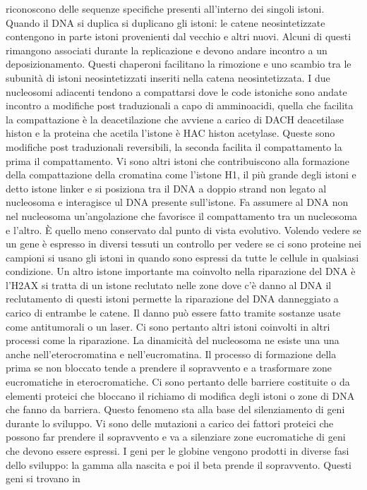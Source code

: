 riconoscono delle sequenze specifiche presenti all'interno dei singoli istoni. Quando il DNA si duplica si duplicano gli istoni: le catene neosintetizzate contengono in parte istoni 
provenienti dal vecchio e altri nuovi. Alcuni di questi rimangono associati durante la replicazione e devono andare incontro a un deposizionamento. Questi chaperoni facilitano la 
rimozione e uno scambio tra le subunit\`a di istoni neosintetizzati inseriti nella catena neosintetizzata. I due nucleosomi adiacenti tendono a compattarsi dove le code istoniche sono
andate incontro a modifiche post traduzionali a capo di amminoacidi, quella che facilita la compattazione \`e la deacetilazione che avviene a carico di DACH deacetilase histon e la 
proteina che acetila l'istone \`e HAC histon acetylase. Queste sono modifiche post traduzionali reversibili, la seconda facilita il compattamento la prima il compattamento. Vi sono 
altri istoni che contribuiscono alla formazione della compattazione della cromatina come l'istone H1, il pi\`u grande degli istoni e detto istone linker e si posiziona tra il DNA a 
doppio strand non legato al nucleosoma e interagisce ul DNA presente sull'istone. Fa assumere al DNA non nel nucleosoma un'angolazione che favorisce il compattamento tra un nucleosoma e 
l'altro. \`E quello meno conservato dal punto di vista evolutivo. Volendo vedere se un gene \`e espresso in diversi tessuti un controllo per vedere se ci sono proteine nei campioni si 
usano gli istoni in quando sono espressi da tutte le cellule in qualsiasi condizione. Un altro istone importante ma coinvolto nella riparazione del DNA \`e l'H2AX si tratta di un istone 
reclutato nelle zone dove c'\`e danno al DNA il reclutamento di questi istoni permette la riparazione del DNA danneggiato a carico di entrambe le catene. Il danno pu\`o essere fatto 
tramite sostanze usate come antitumorali o un laser. Ci sono pertanto altri istoni coinvolti in altri processi come la riparazione. La dinamicit\`a del nucleosoma ne esiste una una anche
nell'eterocromatina e nell'eucromatina. Il processo di formazione della prima se non bloccato tende a prendere il sopravvento e a trasformare zone eucromatiche in eterocromatiche. Ci sono
pertanto delle barriere costituite o da elementi proteici che bloccano il richiamo di modifica degli istoni o zone di DNA che fanno da barriera. Questo fenomeno sta alla base del 
silenziamento di geni durante lo sviluppo. Vi sono delle mutazioni a carico dei fattori proteici che possono far prendere il sopravvento e va a silenziare zone eucromatiche di geni
che devono essere espressi. I geni per le globine vengono prodotti in diverse fasi dello sviluppo: la gamma alla nascita e poi il beta prende il sopravvento. Questi geni si trovano in 
